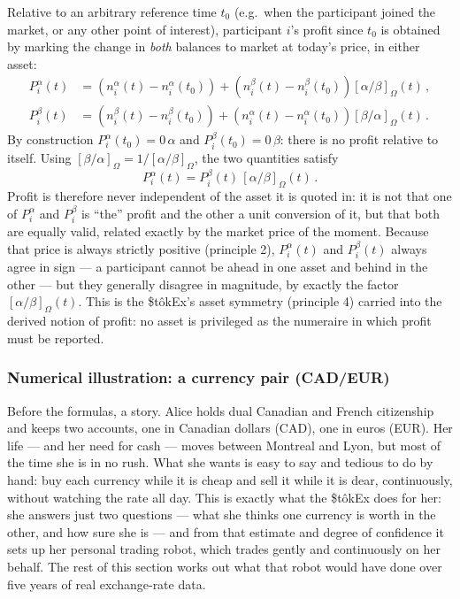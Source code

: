 \documentclass[letterpaper]{article}
\newcommand{\priceAB}{\left[\alpha / \beta\right]}
\newcommand{\priceBA}{\left[\beta / \alpha\right]}
\newcommand{\StokEx}{\$t\^{o}kEx}
\begin{document}
Relative to an arbitrary reference time $t_0$ (e.g.\ when the participant joined the market, or any other point of interest), participant $i$'s profit since $t_0$ is obtained by marking the change in \emph{both} balances to market at today's price, in either asset:
\begin{align}
    P_i^\alpha(t) &= \left(n_i^\alpha(t) - n_i^\alpha(t_0)\right) + \left(n_i^\beta(t) - n_i^\beta(t_0)\right)\priceAB_\Omega\!(t) \,, \label{eqParticipantProfitAlpha}\\
    P_i^\beta(t) &= \left(n_i^\beta(t) - n_i^\beta(t_0)\right) + \left(n_i^\alpha(t) - n_i^\alpha(t_0)\right)\priceBA_\Omega\!(t) \,. \label{eqParticipantProfitBeta}
\end{align}
By construction $P_i^\alpha(t_0) = 0\,\alpha$ and $P_i^\beta(t_0) = 0\,\beta$: there is no profit relative to itself. Using $\priceBA_\Omega = 1/\priceAB_\Omega$, the two quantities satisfy
\begin{equation}
    P_i^\alpha(t) = P_i^\beta(t)\, \priceAB_\Omega(t) \,. \label{eqProfitIdentity}
\end{equation}
Profit is therefore never independent of the asset it is quoted in: it is not that one of $P_i^\alpha$ and $P_i^\beta$ is ``the'' profit and the other a unit conversion of it, but that both are equally valid, related exactly by the market price of the moment. Because that price is always strictly positive (principle 2), $P_i^\alpha(t)$ and $P_i^\beta(t)$ always agree in sign --- a participant cannot be ahead in one asset and behind in the other --- but they generally disagree in magnitude, by exactly the factor $\priceAB_\Omega(t)$. This is the \StokEx{}'s asset symmetry (principle 4) carried into the derived notion of profit: no asset is privileged as the numeraire in which profit must be reported.


\subsubsection{Numerical illustration: a currency pair (CAD/EUR)}

Before the formulas, a story. Alice holds dual Canadian and French citizenship and keeps two accounts, one in Canadian dollars (CAD), one in euros (EUR). Her life --- and her need for cash --- moves between Montreal and Lyon, but most of the time she is in no rush. What she wants is easy to say and tedious to do by hand: buy each currency while it is cheap and sell it while it is dear, continuously, without watching the rate all day. This is exactly what the \StokEx{} does for her: she answers just two questions --- what she thinks one currency is worth in the other, and how sure she is --- and from that estimate and degree of confidence it sets up her personal trading robot, which trades gently and continuously on her behalf. The rest of this section works out what that robot would have done over five years of real exchange-rate data.
\end{document}
